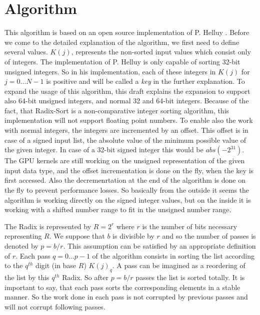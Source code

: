 \documentclass{llncs}
\title{\doctype}
\author{Hennadiy Yatskov\\ Nico Mürdter}
\institute{
Karlsruhe Institute of Technology, Karlsruhe, Germany\\
\email{hennadiy.yatskov@student.kit.edu\\ nico.muerdter@student.kit.edu}}
\begin{document}

\def\iterationcnt{5}

\maketitle

\begin{abstract}
TODO
\end{abstract}

\pagestyle{plain}

\section{Algorithm}
\label{Algorithm}
This algorithm is based on an open source implementation of P. Helluy \cite{ocl-radix-helluy}. Before we come to the detailed explanation of the algorithm, we first need to define several values. $K(j)$, represents the non-sorted input values which consist only of integers. The implementation of P. Helluy is only capable of sorting 32-bit unsigned integers. So in his implementation, each of these integers in $K(j)$ for $j=0 \dots N-1$ is positive and will be called a \textit{key} in the further explanation. To expand the usage of this algorithm, this draft explains the expansion to support also 64-bit unsigned integers, and normal 32 and 64-bit integers. Because of the fact, that Radix-Sort is a non-comparative integer sorting algorithm, this implementation will not support floating point numbers. To enable also the work with normal integers, the integers are incremented by an offset. This offset is in case of a signed input list, the absolute value of the minimum possible value of the given integer. In case of a 32-bit signed integer this would be $abs(-2^{31})$. The GPU kernels are still working on the unsigned representation of the given input data type, and the offset incrementation is done on the fly, when the key is first accessed. Also the decremenrtation at the end of the algorithm is done on the fly to prevent performance losses. So basically from the outside it seems the algorithm is working directly on the signed integer values, but on the inside it is working with a shifted number range to fit in the unsigned number range.

The Radix is represented by $R = 2^r$ where $r$ is the number of bits necessary representing $R$. We suppose that $b$ is divisible by $r$ and so the number of passes is denoted by $p = b/r$. This assumption can be satisfied by an appropriate definition of $r$. Each pass $q=0 \dots p-1$ of the algorithm consists in sorting the list according to the $q^{th}$ digit (in base $R$) $K(j)_q$. A pass can be imagined as a reordering of the list by this $q^{th}$ Radix. So after $p = b/r$ passes the list is sorted totally. It is important to say, that each pass sorts the corresponding elements in a stable manner. So the work done in each pass is not corrupted by previous passes and will not corrupt following passes.
\end{document}
